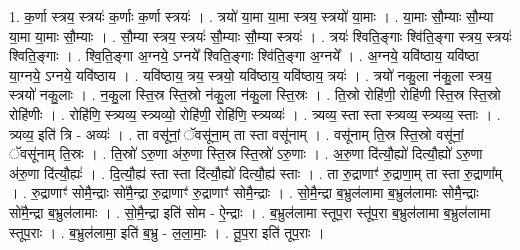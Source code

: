 \documentclass[17pt]{extarticle}
\begin{document}
1. क॒र्णा स्त्रय॒ स्त्रयः॑ क॒र्णाः क॒र्णा स्त्रयः॑ । . त्रयो॑ या॒मा या॒मा स्त्रय॒ स्त्रयो॑ या॒माः । . या॒माः सौ॒म्याः सौ॒म्या या॒मा या॒माः सौ॒म्याः । . सौ॒म्या स्त्रय॒ स्त्रयः॑ सौ॒म्याः सौ॒म्या स्त्रयः॑ । . त्रयः॑ श्विति॒ङ्गाः श्वि॑ति॒ङ्गा स्त्रय॒ स्त्रयः॑ श्विति॒ङ्गाः । . श्वि॒ति॒ङ्गा अ॒ग्नये॒ ऽग्नये᳚ श्विति॒ङ्गाः श्वि॑ति॒ङ्गा अ॒ग्नये᳚ । . अ॒ग्नये॒ यवि॑ष्ठाय॒ यवि॑ष्ठा या॒ग्नये॒ ऽग्नये॒ यवि॑ष्ठाय । . यवि॑ष्ठाय॒ त्रय॒ स्त्रयो॒ यवि॑ष्ठाय॒ यवि॑ष्ठाय॒ त्रयः॑ । . त्रयो॑ नकु॒ला न॑कु॒ला स्त्रय॒ स्त्रयो॑ नकु॒लाः । . न॒कु॒ला स्ति॒स्र स्ति॒स्रो न॑कु॒ला न॑कु॒ला स्ति॒स्रः । . ति॒स्रो रोहि॑णी॒ रोहि॑णी स्ति॒स्र स्ति॒स्रो रोहि॑णीः । . रोहि॑णि॒ स्त्र्यव्य॒ स्त्र्यव्यो॒ रोहि॑णी॒ रोहि॑णि॒ स्त्र्यव्यः॑ । . त्र्यव्य॒ स्ता स्ता स्त्र्यव्य॒ स्त्र्यव्य॒ स्ताः । . त्र्यव्य॒ इति॑ त्रि - अव्यः॑ । . ता वसू॑नां॒ ॅवसू॑ना॒म् ता स्ता वसू॑नाम् । . वसू॑नाम् ति॒स्र स्ति॒स्रो वसू॑नां॒ ॅवसू॑नाम् ति॒स्रः । . ति॒स्रो॑ ऽरु॒णा अ॑रु॒णा स्ति॒स्र स्ति॒स्रो॑ ऽरु॒णाः । . अ॒रु॒णा दि॑त्यौ॒ह्यो॑ दित्यौ॒ह्यो॑ ऽरु॒णा अ॑रु॒णा दि॑त्यौ॒ह्यः॑ । . दि॒त्यौ॒ह्य॑ स्ता स्ता दि॑त्यौ॒ह्यो॑ दित्यौ॒ह्य॑ स्ताः । . ता रु॒द्राणाꣳ॑ रु॒द्राणा॒म् ता स्ता रु॒द्राणा᳚म् । . रु॒द्राणाꣳ॑ सोमै॒न्द्राः सो॑मै॒न्द्रा रु॒द्राणाꣳ॑ रु॒द्राणाꣳ॑ सोमै॒न्द्राः । . सो॒मै॒न्द्रा ब॒भ्रुल॑लामा ब॒भ्रुल॑लामाः सोमै॒न्द्राः सो॑मै॒न्द्रा ब॒भ्रुल॑लामाः । . सो॒मै॒न्द्रा इति॑ सोम - ऐ॒न्द्राः । . ब॒भ्रुल॑लामा स्तूप॒रा स्तू॑प॒रा ब॒भ्रुल॑लामा ब॒भ्रुल॑लामा स्तूप॒राः । . ब॒भ्रुल॑लामा॒ इति॑ ब॒भ्रु - ल॒ला॒माः॒ । . तू॒प॒रा इति॑ तूप॒राः । \newline
\end{document}
